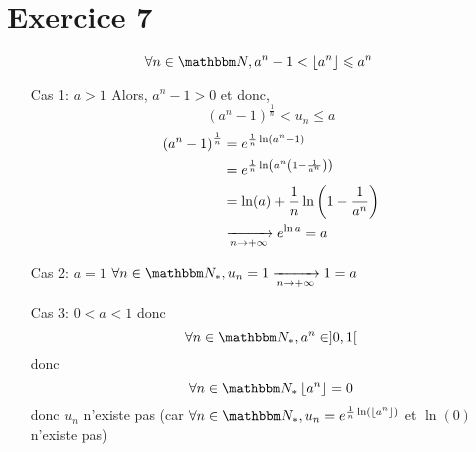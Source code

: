 \part{Exercice 7}

 \[
\forall n \in \N, a^n - 1 < \left\lfloor a^n \right\rfloor \le a^n
\] 
\begin{itemize}
	\item[\sc Cas 1: $a > 1$]
		Alors, $a^n - 1 > 0$ et donc, \[
			\left( a^n-1 \right) ^{\frac{1}{n}} < u_n \le a
		\]
		\begin{align*}
			\left( a^n - 1 \right)^{\frac{1}{n}} &= e^{\frac{1}{n}\ln\left( a^n-1 \right)} \\
															 &= e^{\frac{1}{n}\ln\left( a^n\left( 1-\frac{1}{a^n} \right)  \right) } \\
															 &= \ln(a) + \frac{1}{n} \ln\left( 1 - \frac{1}{a^n} \right)  \\
															 &\xrightarrow[n \to +\infty]{} e^{\ln a} = a
		\end{align*}
	\item[\sc Cas 2: $a=1 $]
		$\forall n \in \N_*, u_n = 1 \tendsto{n\to +\infty} 1 = a$ 
	\item[\sc Cas 3: $0 < a < 1 $] donc \[
		\forall n \in \N_*, a^n \in ]0,1[
	\] donc \[
		\forall n \in \N_* \left\lfloor a^n \right\rfloor = 0
	\] donc $u_n$ n'existe pas (car $\forall n \in \N_*, u_n = e^{\frac{1}{n}\ln\left( \left\lfloor a^n \right\rfloor \right) }$ et $\ln(0)$ n'existe pas)

\end{itemize}
